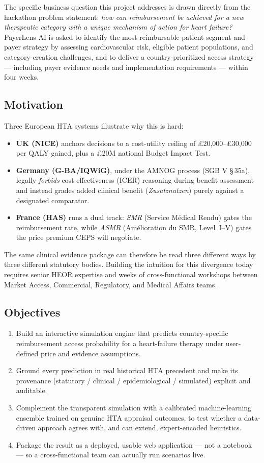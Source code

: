 \documentclass[11pt,a4paper]{article}
\begin{document}
The specific business question this project addresses is drawn directly from the hackathon
problem statement: \emph{how can reimbursement be achieved for a new therapeutic category with a
unique mechanism of action for heart failure?} PayerLens AI is asked to identify the most
reimbursable patient segment and payer strategy by assessing cardiovascular risk, eligible patient
populations, and category-creation challenges, and to deliver a country-prioritized access
strategy --- including payer evidence needs and implementation requirements --- within four weeks.

\subsection{Motivation}
Three European HTA systems illustrate why this is hard:
\begin{itemize}[leftmargin=1.3em]
  \item \textbf{UK (NICE)} anchors decisions to a cost-utility ceiling of £20,000--£30,000 per
  QALY gained, plus a £20M national Budget Impact Test.
  \item \textbf{Germany (G-BA/IQWiG)}, under the AMNOG process (SGB V \S\,35a), legally
  \emph{forbids} cost-effectiveness (ICER) reasoning during benefit assessment and instead grades
  added clinical benefit (\emph{Zusatznutzen}) purely against a designated comparator.
  \item \textbf{France (HAS)} runs a dual track: \emph{SMR} (Service M\'edical Rendu) gates the
  reimbursement rate, while \emph{ASMR} (Amélioration du SMR, Level~I--V) gates the price premium
  CEPS will negotiate.
\end{itemize}
The same clinical evidence package can therefore be read three different ways by three different
statutory bodies. Building the intuition for this divergence today requires senior HEOR expertise
and weeks of cross-functional workshops between Market Access, Commercial, Regulatory, and Medical
Affairs teams.

\subsection{Objectives}
\begin{enumerate}[leftmargin=1.5em]
  \item Build an interactive simulation engine that predicts country-specific reimbursement access
  probability for a heart-failure therapy under user-defined price and evidence assumptions.
  \item Ground every prediction in real historical HTA precedent and make its provenance
  (statutory / clinical / epidemiological / simulated) explicit and auditable.
  \item Complement the transparent simulation with a calibrated machine-learning ensemble trained on
  genuine HTA appraisal outcomes, to test whether a data-driven approach agrees with, and can
  extend, expert-encoded heuristics.
  \item Package the result as a deployed, usable web application --- not a notebook --- so a
  cross-functional team can actually run scenarios live.
\end{enumerate}
\end{document}
